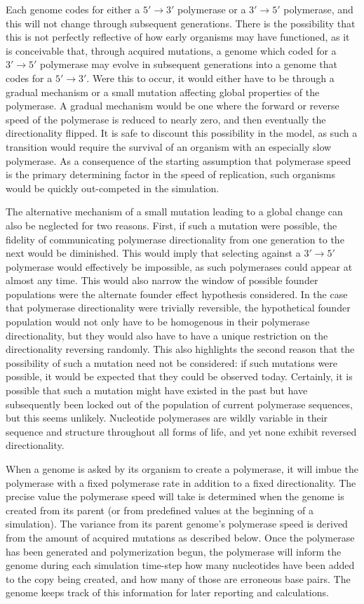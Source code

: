 Each genome codes for either a $5'\to3'$ polymerase or a $3'\to5'$ polymerase, and this will not change through subsequent generations. There is the possibility that this is not perfectly reflective of how early organisms may have functioned, as it is conceivable that, through acquired mutations, a genome which coded for a $3'\to5'$ polymerase may evolve in subsequent generations into a genome that codes for a $5'\to3'$. Were this to occur, it would either have to be through a gradual mechanism or a small mutation affecting global properties of the polymerase. A gradual mechanism would be one where the forward or reverse speed of the polymerase is reduced to nearly zero, and then eventually the directionality flipped. It is safe to discount this possibility in the model, as such a transition would require the survival of an organism with an especially slow polymerase. As a consequence of the starting assumption that polymerase speed is the primary determining factor in the speed of replication, such organisms would be quickly out-competed in the simulation.

The alternative mechanism of a small mutation leading to a global change can also be neglected for two reasons. First, if such a mutation were possible, the fidelity of communicating polymerase directionality from one generation to the next would be diminished. This would imply that selecting against a $3'\to5'$ polymerase would effectively be impossible, as such polymerases could appear at almost any time. This would also narrow the window of possible founder populations were the alternate founder effect hypothesis considered. In the case that polymerase directionality were trivially reversible, the hypothetical founder population would not only have to be homogenous in their polymerase directionality, but they would also have to have a unique restriction on the directionality reversing randomly. This also highlights the second reason that the possibility of such a mutation need not be considered: if such mutations were possible, it would be expected that they could be observed today. Certainly, it is possible that such a mutation might have existed in the past but have subsequently been locked out of the population of current polymerase sequences, but this seems unlikely. Nucleotide polymerases are wildly variable in their sequence and structure throughout all forms of life, and yet none exhibit reversed directionality.

When a genome is asked by its organism to create a polymerase, it will imbue the polymerase with a fixed polymerase rate in addition to a fixed directionality. The precise value the polymerase speed will take is determined when the genome is created from its parent (or from predefined values at the beginning of a simulation). The variance from its parent genome's polymerase speed is derived from the amount of acquired mutations as described below. Once the polymerase has been generated and polymerization begun, the polymerase will inform the genome during each simulation time-step how many nucleotides have been added to the copy being created, and how many of those are erroneous base pairs. The genome keeps track of this information for later reporting and calculations.


